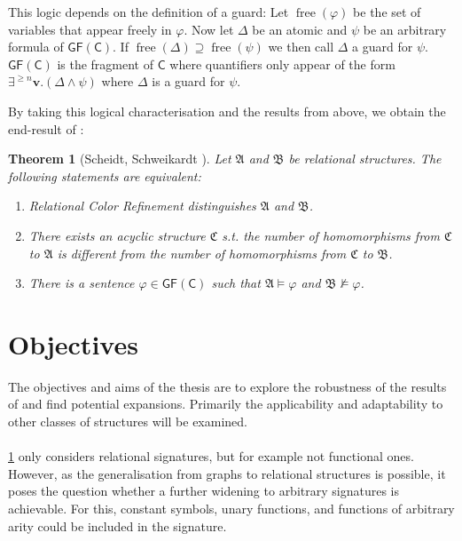 \documentclass[a4paper,11pt,DIV=15]{scrartcl} %
\theoremstyle{plain}
\newtheorem{theorem}{Theorem}
\theoremstyle{definition}
\begin{document}
This logic depends on the definition of a guard: 
Let $\operatorname{free}(\varphi)$ be the set of variables that appear freely in $\varphi$.
Now let $\Delta$ be an atomic and $\psi$ be an arbitrary formula of $\mathsf{GF}(\mathsf C)$.
If $\operatorname{free}(\Delta)\supseteq\operatorname{free}(\psi)$ we then call $\Delta$ a guard for $\psi$.
$\mathsf{GF}(\mathsf C)$ is the fragment of $\mathsf C$ where quantifiers only appear of the form $\exists^{\geq n}\mathbf v.(\Delta \land \psi)$ where $\Delta$ is a guard for $\psi$.

By taking this logical characterisation and the results from above, we obtain the end-result of \cite{scheidt2024color}:

\begin{theorem}[Scheidt, Schweikardt \cite{scheidt2024color}]
	Let $\mathfrak A$ and $\mathfrak B$ be relational structures. The following statements are equivalent:
	\begin{enumerate}
		\item Relational Color Refinement distinguishes $\mathfrak A$ and $\mathfrak B$.
		\item There exists an acyclic structure $\mathfrak C$ s.t. the number of homomorphisms from $\mathfrak C$ to $\mathfrak A$ is different from the number of homomorphisms from $\mathfrak C$ to $\mathfrak B$.
		\item There is a sentence $\varphi\in \mathsf{GF}(\mathsf C)$ such that $\mathfrak A\models\varphi$ and $\mathfrak B\not\models\varphi$.
	\end{enumerate}
	\label{RCRMainThm}
\end{theorem}

\section{Objectives}
\label{Sec::Objectives}

The objectives and aims of the thesis are to explore the robustness of the results of \cite{scheidt2024color} and find potential expansions. 
Primarily the applicability and adaptability to other classes of structures will be examined.
\\ \\
\cref{RCRMainThm} only considers relational signatures, but for example not functional ones.
However, as the generalisation from graphs to relational structures is possible, it poses the question whether a further widening to arbitrary signatures is achievable.
For this, constant symbols, unary functions, and functions of arbitrary arity could be included in the signature.
\end{document}
